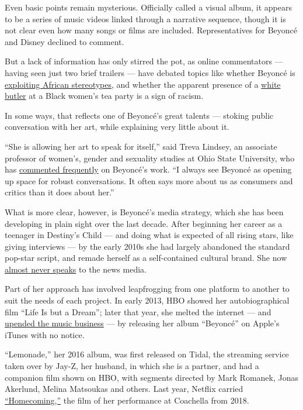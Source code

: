 Even basic points remain mysterious. Officially called a visual album,
it appears to be a series of music videos linked through a narrative
sequence, though it is not clear even how many songs or films are
included. Representatives for Beyoncé and Disney declined to comment.

But a lack of information has only stirred the pot, as online
commentators --- having seen just two brief trailers --- have debated
topics like whether Beyoncé is
\href{https://www.washingtonpost.com/world/africa/beyonce-black-is-king-africa-backlash/2020/07/08/cfaa2dd2-c079-11ea-864a-0dd31b9d6917_story.html}{exploiting
African stereotypes}, and whether the apparent presence of a
\href{https://twitter.com/lulu_4_lu_puffs/status/1287890438976929792/photo/1}{white
butler} at a Black women's tea party is a sign of racism.

In some ways, that reflects one of Beyoncé's great talents --- stoking
public conversation with her art, while explaining very little about it.

``She is allowing her art to speak for itself,'' said Treva Lindsey, an
associate professor of women's, gender and sexuality studies at Ohio
State University, who has
\href{https://wfpl.org/strange-fruit-unpacking-symbolism-beyonces-lemonade/}{commented
frequently} on Beyoncé's work. ``I always see Beyoncé as opening up
space for robust conversations. It often says more about us as consumers
and critics than it does about her.''

What is more clear, however, is Beyoncé's media strategy, which she has
been developing in plain sight over the last decade. After beginning her
career as a teenager in Destiny's Child --- and doing what is expected
of all rising stars, like giving interviews --- by the early 2010s she
had largely abandoned the standard pop-star script, and remade herself
as a self-contained cultural brand. She now
\href{https://www.nytimes3xbfgragh.onion/2015/08/20/fashion/beyonce-is-seen-but-not-heard.html}{almost
never speaks} to the news media.

Part of her approach has involved leapfrogging from one platform to
another to suit the needs of each project. In early 2013, HBO showed her
autobiographical film ``Life Is but a Dream''; later that year, she
melted the internet --- and
\href{https://www.nytimes3xbfgragh.onion/2016/04/24/arts/music/beyonce-hbo-lemonade.html}{upended
the music business} --- by releasing her album ``Beyoncé'' on Apple's
iTunes with no notice.

``Lemonade,'' her 2016 album, was first released on Tidal, the streaming
service taken over by Jay-Z, her husband, in which she is a partner, and
had a companion film shown on HBO, with segments directed by Mark
Romanek, Jonas Akerlund, Melina Matsoukas and others. Last year, Netflix
carried
\href{https://www.nytimes3xbfgragh.onion/2019/04/17/arts/music/beyonce-netflix-homecoming.html}{``Homecoming,''}
the film of her performance at Coachella from 2018.

